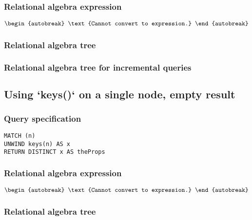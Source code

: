 \subsubsection*{Relational algebra expression}

\begin{align*}
\begin{autobreak}
\text{Cannot convert to expression.}
\end{autobreak}
\end{align*}

\subsubsection*{Relational algebra tree}


\subsubsection*{Relational algebra tree for incremental queries}


\subsection{Using `keys()` on a single node, empty result}

\subsubsection*{Query specification}

\begin{lstlisting}
MATCH (n)
UNWIND keys(n) AS x
RETURN DISTINCT x AS theProps
\end{lstlisting}

\subsubsection*{Relational algebra expression}

\begin{align*}
\begin{autobreak}
\text{Cannot convert to expression.}
\end{autobreak}
\end{align*}

\subsubsection*{Relational algebra tree}

